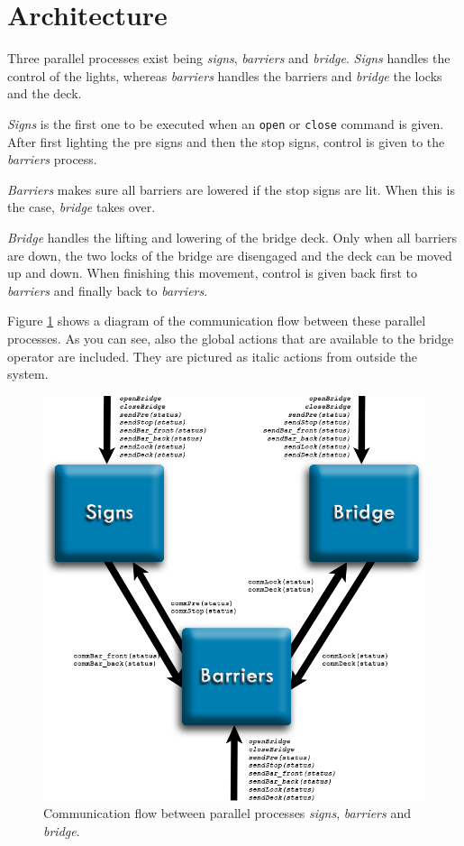 \newpage
\section{Architecture}
\label{sec:arch}

Three parallel processes exist being \emph{signs}, \emph{barriers} and \emph{bridge}. \emph{Signs} handles the control of the lights, whereas \emph{barriers} handles the barriers and \emph{bridge} the locks and the deck.

\emph{Signs} is the first one to be executed when an \texttt{open} or \texttt{close} command is given. After first lighting the pre signs and then the stop signs, control is given to the \emph{barriers} process.

\emph{Barriers} makes sure all barriers are lowered if the stop signs are lit. When this is the case, \emph{bridge} takes over.

\emph{Bridge} handles the lifting and lowering of the bridge deck. Only when all barriers are down, the two locks of the bridge are disengaged and the deck can be moved up and down. When finishing this movement, control is given back first to \emph{barriers} and finally back to \emph{barriers}.

Figure \ref{fig:arch} shows a diagram of the communication flow between these parallel processes. As you can see, also the global actions that are available to the bridge operator are included. They are pictured as italic actions from outside the system.
%
\begin{figure}[htb]%
\centering
\includegraphics[width=0.5\columnwidth]{Images/Architecture}%
\caption{Communication flow between parallel processes \emph{signs}, \emph{barriers} and \emph{bridge}.}%
\label{fig:arch}%
\end{figure}
%

\newpage
